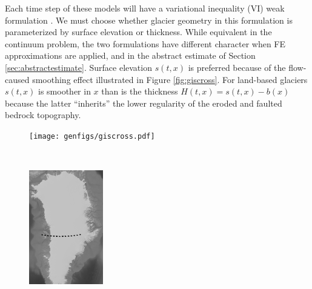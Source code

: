 \documentclass[hidelinks,onefignum,onetabnum,final]{siamart220329}  %
\begin{document}
Each time step of these models will have a variational inequality (VI) weak formulation \cite{Evans2010,KinderlehrerStampacchia1980}.  We must choose whether glacier geometry in this formulation is parameterized by surface elevation or thickness.  While equivalent in the continuum problem, the two formulations have different character when FE approximations are applied, and in the abstract estimate of Section \ref{sec:abstractestimate}.  Surface elevation $s(t,x)$ is preferred because of the flow-caused smoothing effect illustrated in Figure \ref{fig:giscross}.  For land-based glaciers $s(t,x)$ is smoother in $x$ than is the thickness $H(t,x) = s(t,x)-b(x)$ because the latter ``inherits'' the lower regularity of the eroded and faulted bedrock topography.

\begin{figure}
\begin{minipage}[t]{0.85\textwidth}
\vspace{0pt}
\texttt{[image: genfigs/giscross.pdf]}
\end{minipage}
\,
\begin{minipage}[t]{0.13\textwidth}
\vspace{10pt}
\includegraphics[width=\textwidth]{genfigs/gis/gris-profile-gray.png}

\end{minipage}
\end{figure}
\end{document}
